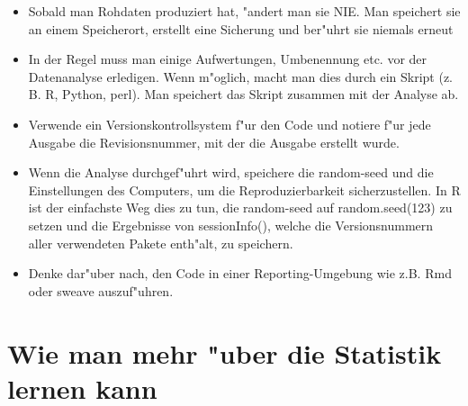 \documentclass[a4paper,twoside]{tufte-book}\usepackage[]{graphicx}\usepackage[]{color}
\begin{document}
\begin{itemize}

\item{Sobald man Rohdaten produziert hat, "andert man sie NIE. Man speichert sie an einem Speicherort, erstellt eine Sicherung und ber"uhrt sie niemals erneut}

\item{In der Regel muss man einige Aufwertungen, Umbenennung etc. vor der Datenanalyse erledigen. Wenn m"oglich, macht man dies durch ein Skript (z. B. R, Python, perl). Man speichert das Skript zusammen mit der Analyse ab.}

\item{Verwende ein Versionskontrollsystem f"ur den Code und notiere f"ur jede Ausgabe die Revisionsnummer, mit der die Ausgabe erstellt wurde.}

\item{Wenn die Analyse durchgef"uhrt wird, speichere die random-seed und die Einstellungen des Computers, um die Reproduzierbarkeit sicherzustellen. In R ist der einfachste Weg dies zu tun, die random-seed auf random.seed(123) zu setzen und die Ergebnisse von sessionInfo(), welche die Versionsnummern aller verwendeten Pakete enth"alt, zu speichern.}

\item{Denke dar"uber nach, den Code in einer Reporting-Umgebung wie z.B. Rmd oder sweave auszuf"uhren.}



\end{itemize}

\section{Wie man mehr "uber die Statistik lernen kann}\label{sec: further readings}
\end{document}
